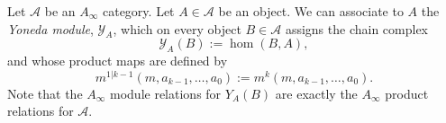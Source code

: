 
Let $\mathcal A$ be an $A_\infty$ category. Let $A\in \mathcal A$ be an object. We can associate to $A$ the \emph{Yoneda module}, $\mathcal Y_A$, which on every object $B\in \mathcal A$ assigns the chain complex
\[\mathcal Y_A(B):=\hom(B, A),\]
and whose product maps are defined by 
\[m^{1|k-1}(m,a_{k-1}, \ldots, a_0):= m^k(m,a_{k-1}, \ldots, a_0).\]
Note that the $A_\infty$ module relations for $Y_A(B)$ are exactly the $A_\infty$ product relations for $\mathcal A$.
\label{exm:yonedaModule}
